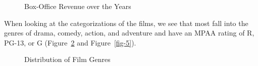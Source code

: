 \documentclass[
]{agujournal2019}
\begin{document}
\begin{figure}


\caption{\label{fig-3}Box-Office Revenue over the Years}

\end{figure}%

When looking at the categorizations of the films, we see that most fall
into the genres of drama, comedy, action, and adventure and have an MPAA
rating of R, PG-13, or G (Figure~\ref{fig-4} and Figure~\ref{fig-5}).

\begin{figure}


\caption{\label{fig-4}Distribution of Film Genres}

\end{figure}%
\end{document}
